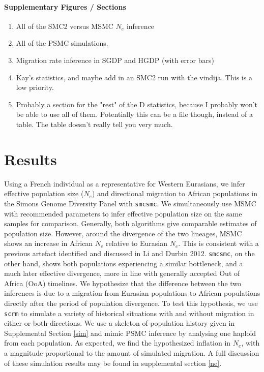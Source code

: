 \documentclass{article}
\begin{document}
\paragraph{Supplementary Figures / Sections}

\begin{enumerate}
    \item All of the SMC2 versus MSMC $N_e$ inference
    \item All of the PSMC simulations.
    \item Migration rate inference in SGDP and HGDP (with error bars)
    \item Kay's statistics, and maybe add in an SMC2 run with the vindija. This is a low priority.
    \item Probably a section for the "rest" of the D statistics, because I probably won't be able to use all of them. Potentially this can be a file though, instead of a table. The table doesn't really tell you very much. 
\end{enumerate}

\newpage

\section{Results}

Using a French individual as a representative for Western Eurasians, we infer effective population size ($N_e$) and directional migration to African populations in the Simons Genome Diversity Panel with {\tt smcsmc}. We simultaneously use MSMC with recommended parameters to infer effective population size on the same samples for comparison. Generally, both algorithms give comparable estimates of population size. However, around the divergence of the two lineages, MSMC shows an increase in African $N_e$ relative to Eurasian $N_e$. This is consistent with a previous artefact identified and discussed in Li and Durbin 2012. {\tt smcsmc}, on the other hand, shows both populations experiencing a similar bottleneck, and a much later effective divergence, more in line with generally accepted Out of Africa (OoA) timelines. We hypothesize that the difference between the two inferences is due to a migration from Eurasian populations to African populations directly after the period of population divergence. To test this hypothesis, we use {\tt scrm} to simulate a variety of historical situations with and without migration in either or both directions. We use a skeleton of population history given in Supplemental Section \ref{sim} and mimic PSMC inference by analysing one haploid from each population. As expected, we find the hypothesized inflation in $N_e$, with a magnitude proportional to the amount of simulated migration. A full discussion of these simulation results may be found in supplemental section \ref{ne}. 
\end{document}
